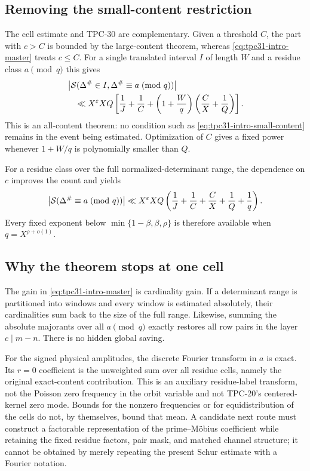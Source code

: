 \subsection{Removing the small-content restriction}

The cell estimate and TPC-30 are complementary.  Given a threshold
$C$, the part with $c>C$ is bounded by the large-content theorem,
whereas \eqref{eq:tpc31-intro-master} treats $c\le C$.  For a single
translated interval $I$ of length $W$ and a residue class $a\pmod q$
this gives
\begin{align}
 &\left|\mathcal S(\Delta^\#\in I,
 \Delta^\#\equiv a\!\pmod q)\right|
 \notag\\
 &\quad\ll X^\varepsilon XQ\left[
 \frac1J+\frac1C
 +\left(1+\frac Wq\right)
 \left(\frac CX+\frac1Q\right)
 \right].
 \label{eq:tpc31-intro-splice}
\end{align}
This is an all-content theorem: no condition such as
\eqref{eq:tpc31-intro-small-content} remains in the event being
estimated.  Optimization of $C$ gives a fixed power whenever
$1+W/q$ is polynomially smaller than $Q$.

For a residue class over the full normalized-determinant range, the
dependence on $c$ improves the count and yields
\begin{equation}
 \left|\mathcal S(\Delta^\#\equiv a\!\pmod q)\right|
 \ll X^\varepsilon XQ
 \left(\frac1J+\frac1C+\frac CX+\frac1Q+\frac1q\right).
 \label{eq:tpc31-intro-full-residue}
\end{equation}
Every fixed exponent below
$\min\{1-\beta,\beta,\rho\}$ is therefore available when
$q=X^{\rho+o(1)}$.

\subsection{Why the theorem stops at one cell}

The gain in \eqref{eq:tpc31-intro-master} is cardinality gain.  If a
determinant range is partitioned into windows and every window is
estimated absolutely, their cardinalities sum back to the size of the
full range.  Likewise, summing the absolute majorants over all
$a\pmod q$ exactly restores all row pairs in the layer $c\mid m-n$.
There is no hidden global saving.

For the signed physical amplitudes, the discrete Fourier transform in
$a$ is exact.  Its $r=0$ coefficient is the unweighted sum over all
residue cells, namely the original exact-content contribution.  This
is an auxiliary residue-label transform, not the Poisson zero frequency
in the orbit variable and not TPC-20's centered-kernel zero mode.
Bounds for the nonzero frequencies or for equidistribution of the
cells do not, by themselves, bound that mean.  A candidate next route
must construct a factorable representation of the prime--M\"obius
coefficient while retaining the fixed residue factors, pair mask, and
matched channel structure; it cannot be obtained by merely repeating
the present Schur estimate with a Fourier notation.

